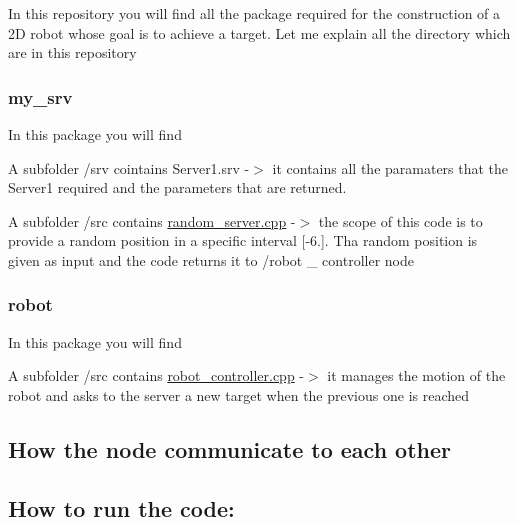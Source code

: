 In this repository you will find all the package required for the construction of a 2D robot whose goal is to achieve a target. Let me explain all the directory which are in this repository

\subsubsection*{my\+\_\+srv}

In this package you will find
\begin{DoxyItemize}
\item A subfolder /srv cointains Server1.\+srv -\/$>$ it contains all the paramaters that the Server1 required and the parameters that are returned.
\item A subfolder /src contains \hyperlink{random__server_8cpp}{random\+\_\+server.\+cpp} -\/$>$ the scope of this code is to provide a random position in a specific interval \mbox{[}-\/6.\mbox{]}. Tha random position is given as input and the code returns it to /robot \+\_\+ controller node
\end{DoxyItemize}

\subsubsection*{robot}

In this package you will find
\begin{DoxyItemize}
\item A subfolder /src contains \hyperlink{robot__controller_8cpp}{robot\+\_\+controller.\+cpp} -\/$>$ it manages the motion of the robot and asks to the server a new target when the previous one is reached
\end{DoxyItemize}

\subsection*{How the node communicate to each other}



\subsection*{How to run the code\+:}


